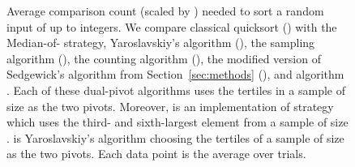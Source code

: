 \documentclass[prodmode,acmtalg]{acmsmall}
\begin{document}
\begin{figure}
    \caption{Average comparison count (scaled by ) needed to sort a random
        input of up to  integers. We compare classical quicksort
        () with the Median-of- strategy, Yaroslavskiy's
        algorithm (), the sampling algorithm (), the
        counting algorithm
        (), the modified
        version of Sedgewick's algorithm from Section~\ref{sec:methods}
        (), and algorithm . Each of these dual-pivot
        algorithms uses the tertiles in a sample of size  as the two pivots.
        Moreover,  is an implementation of strategy 
        which uses the third- and sixth-largest element from a sample of size
        .  is Yaroslavskiy's algorithm choosing the tertiles
        of a sample of size  as the two pivots. Each data point is the
        average over  trials. }
    \label{fig:comp:sample}
\end{figure}
\end{document}
